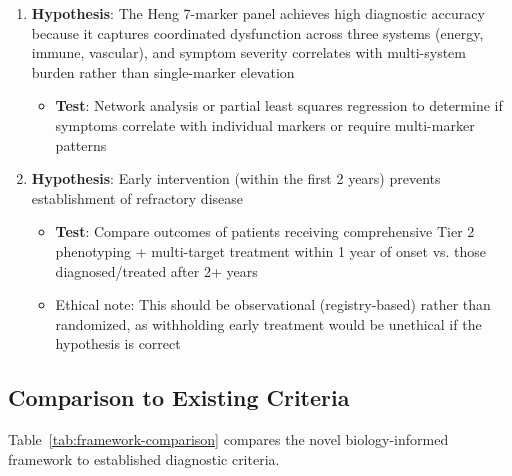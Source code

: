 \begin{enumerate}
    \item \textbf{Hypothesis}: The Heng 7-marker panel achieves high diagnostic accuracy because it captures coordinated dysfunction across three systems (energy, immune, vascular), and symptom severity correlates with multi-system burden rather than single-marker elevation
    \begin{itemize}
        \item \textbf{Test}: Network analysis or partial least squares regression to determine if symptoms correlate with individual markers or require multi-marker patterns
    \end{itemize}

    \item \textbf{Hypothesis}: Early intervention (within the first 2 years) prevents establishment of refractory disease
    \begin{itemize}
        \item \textbf{Test}: Compare outcomes of patients receiving comprehensive Tier 2 phenotyping + multi-target treatment within 1 year of onset vs. those diagnosed/treated after 2+ years
        \item Ethical note: This should be observational (registry-based) rather than randomized, as withholding early treatment would be unethical if the hypothesis is correct
    \end{itemize}
\end{enumerate}

\subsection{Comparison to Existing Criteria}
\label{subsec:comparison}

Table~\ref{tab:framework-comparison} compares the novel biology-informed framework to established diagnostic criteria.

